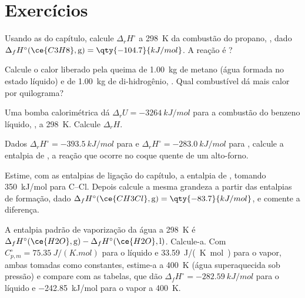 \section{Exercícios}

\begin{exercise}[$\star$]\label{exo:b2:reaction-enthalpy:1}
Usando as  do capítulo, calcule
$\Delta_r H^\circ$ a \qty{298}{K} da combustão do propano,
, dado $\Delta_f
H^\circ(\ce{C3H8}, \text{g}) = \qty{-104.7}{kJ/mol}$. A reação é
?
\end{exercise}

\begin{exercise}[$\star$]\label{exo:b2:reaction-enthalpy:2}
Calcule o calor liberado pela queima de \qty{1.00}{kg} de metano (água
formada no estado líquido) e de \qty{1.00}{kg} de di-hidrogênio, . Qual combustível dá mais calor por quilograma?
\end{exercise}

\begin{exercise}[$\star$]\label{exo:b2:reaction-enthalpy:3}
Uma bomba calorimétrica dá $\Delta_r U = \qty{-3264}{kJ/mol}$ para a
combustão do benzeno líquido, , a
\qty{298}{K}. Calcule $\Delta_r H$.
\end{exercise}

\begin{exercise}[$\star$]\label{exo:b2:reaction-enthalpy:4}
Dados $\Delta_r H^\circ = \qty{-393.5}{kJ/mol}$ para  e $\Delta_r H^\circ = \qty{-283.0}{kJ/mol}$ para , calcule a entalpia de ,
a reação que ocorre no coque quente de um alto-forno.
\end{exercise}

\begin{exercise}[$\star\star$]\label{exo:b2:reaction-enthalpy:5}
Estime, com as entalpias de ligação do capítulo, a entalpia de
, tomando \qty{350}{kJ/mol} para
C--Cl. Depois calcule a mesma grandeza a partir das entalpias de formação,
dado $\Delta_f H^\circ(\ce{CH3Cl}, \text{g}) = \qty{-83.7}{kJ/mol}$, e
comente a diferença.
\end{exercise}

\begin{exercise}[$\star\star$]\label{exo:b2:reaction-enthalpy:6}
A entalpia padrão de vaporização da água a \qty{298}{K} é
$\Delta_f H^\circ(\ce{H2O}, \text{g}) - \Delta_f H^\circ(\ce{H2O},
\text{l})$. Calcule-a. Com $C_{p,m}^\circ = \qty{75.35}{J/(K.mol)}$ para
o líquido e \qty{33.59}{J/(K.mol)} para o vapor, ambas tomadas como
constantes, estime-a a \qty{400}{K} (água superaquecida sob pressão)
e compare com as tabelas, que dão $\Delta_f H^\circ =
\qty{-282.59}{kJ/mol}$ para o líquido e \qty{-242.85}{kJ/mol} para o
vapor a \qty{400}{K}.
\end{exercise}

